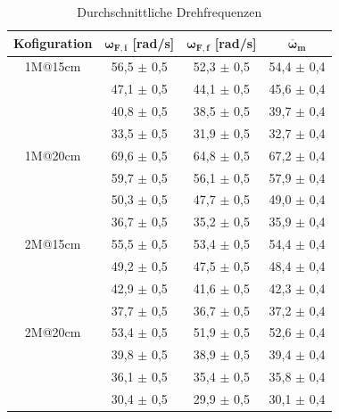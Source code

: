 \documentclass{article}
\begin{document}
\begin{table}[!h]
    \centering
    \begin{tabular}{cccc}
        \hline
        \textbf{Kofiguration} & $\bm{\omega_{F,i}}$ [rad/s] & $\bm{\omega_{F,f}}$ [rad/s] & $\bm{\overline{\omega}_m}$  \\ \hline
         1M@15cm  &   56,5 $\pm$ 0,5 &  52,3 $\pm$ 0,5 &   54,4 $\pm$ 0,4 \\
                  &   47,1 $\pm$ 0,5 &  44,1 $\pm$ 0,5 &   45,6 $\pm$ 0,4 \\
                  &   40,8 $\pm$ 0,5 &  38,5 $\pm$ 0,5 &   39,7 $\pm$ 0,4 \\
                  &   33,5 $\pm$ 0,5 &  31,9 $\pm$ 0,5 &   32,7 $\pm$ 0,4 \\ \hline
         1M@20cm  &   69,6 $\pm$ 0,5 &  64,8 $\pm$ 0,5 &   67,2 $\pm$ 0,4 \\
                  &   59,7 $\pm$ 0,5 &  56,1 $\pm$ 0,5 &   57,9 $\pm$ 0,4 \\
                  &   50,3 $\pm$ 0,5 &  47,7 $\pm$ 0,5 &   49,0 $\pm$ 0,4 \\
                  &   36,7 $\pm$ 0,5 &  35,2 $\pm$ 0,5 &   35,9 $\pm$ 0,4 \\ \hline
         2M@15cm  &   55,5 $\pm$ 0,5 &  53,4 $\pm$ 0,5 &   54,4 $\pm$ 0,4 \\
                  &   49,2 $\pm$ 0,5 &  47,5 $\pm$ 0,5 &   48,4 $\pm$ 0,4 \\
                  &   42,9 $\pm$ 0,5 &  41,6 $\pm$ 0,5 &   42,3 $\pm$ 0,4 \\
                  &   37,7 $\pm$ 0,5 &  36,7 $\pm$ 0,5 &   37,2 $\pm$ 0,4 \\ \hline
         2M@20cm  &   53,4 $\pm$ 0,5 &  51,9 $\pm$ 0,5 &   52,6 $\pm$ 0,4 \\
                  &   39,8 $\pm$ 0,5 &  38,9 $\pm$ 0,5 &   39,4 $\pm$ 0,4 \\
                  &   36,1 $\pm$ 0,5 &  35,4 $\pm$ 0,5 &   35,8 $\pm$ 0,4 \\
                  &   30,4 $\pm$ 0,5 &  29,9 $\pm$ 0,5 &   30,1 $\pm$ 0,4 \\ \hline
    \end{tabular}%
    \caption{Durchschnittliche Drehfrequenzen}
    \label{tab:w_m}
\end{table}
\end{document}
